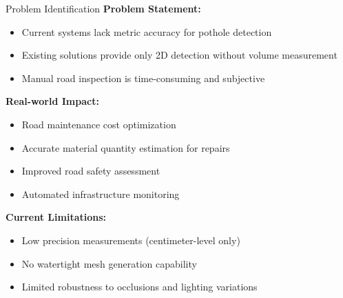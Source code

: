 \documentclass[aspectratio=169]{beamer}
\begin{document}
\begin{frame}{Problem Identification}
\textbf{Problem Statement:}
\begin{itemize}
\item Current systems lack metric accuracy for pothole detection
\item Existing solutions provide only 2D detection without volume measurement
\item Manual road inspection is time-consuming and subjective
\end{itemize}

\vspace{0.5cm}

\textbf{Real-world Impact:}
\begin{itemize}
\item Road maintenance cost optimization
\item Accurate material quantity estimation for repairs
\item Improved road safety assessment
\item Automated infrastructure monitoring
\end{itemize}

\vspace{0.5cm}

\textbf{Current Limitations:}
\begin{itemize}
\item Low precision measurements (centimeter-level only)
\item No watertight mesh generation capability
\item Limited robustness to occlusions and lighting variations
\end{itemize}
\end{frame}
\end{document}
